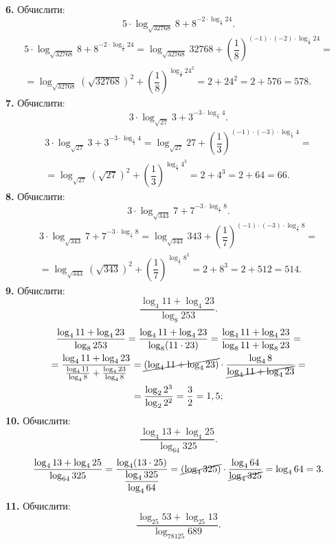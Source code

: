 \textbf{6.} Обчислити:
$$
5\cdot\log_{\sqrt{32768}}8+8^{-2\cdot\log_{\frac{1}{8}}24}.
$$
\begin{multline*}
5\cdot\log_{\sqrt{32768}}8+8^{-2\cdot\log_{\frac{1}{8}}24}=
\log_{\sqrt{32768}}32768+\left(\dfrac{1}{8}\right)^{(-1)\cdot(-2)\cdot\log_{\frac{1}{8}}24}=\\
=\log_{\sqrt{32768}}\left(\sqrt{32768}\right)^2+\left(\dfrac{1}{8}\right)^{\log_{\frac{1}{8}}24^2}=
2+24^2=2+576=578.
\end{multline*}
\textbf{7.} Обчислити:
$$
3\cdot\log_{\sqrt{27}}3+3^{-3\cdot\log_{\frac{1}{3}}4}.
$$
\begin{multline*}
3\cdot\log_{\sqrt{27}}3+3^{-3\cdot\log_{\frac{1}{3}}4}=
\log_{\sqrt{27}}27+\left(\dfrac{1}{3}\right)^{(-1)\cdot(-3)\cdot\log_{\frac{1}{3}}4}=\\
=\log_{\sqrt{27}}\left(\sqrt{27}\right)^2+\left(\dfrac{1}{3}\right)^{\log_{\frac{1}{3}}4^3}=
2+4^3=2+64=66.
\end{multline*}
\textbf{8.} Обчислити:
$$
3\cdot\log_{\sqrt{343}}7+7^{-3\cdot\log_{\frac{1}{7}}8}.
$$
\begin{multline*}
3\cdot\log_{\sqrt{343}}7+7^{-3\cdot\log_{\frac{1}{7}}8}=
\log_{\sqrt{343}}343+\left(\dfrac{1}{7}\right)^{(-1)\cdot(-3)\cdot\log_{\frac{1}{7}}8}=\\
=\log_{\sqrt{343}}\left(\sqrt{343}\right)^2+\left(\dfrac{1}{7}\right)^{\log_{\frac{1}{7}}8^3}=
2+8^3=2+512=514.
\end{multline*}
\textbf{9.} Обчислити:
$$
\frac{\log_4 11 + \log_4 23}{\log_8 253}.
$$
\begin{multline*}
\frac{\log_4 11 + \log_4 23}{\log_8 253} =
\frac{\log_4 11 + \log_4 23}{\log_8 (11 \cdot 23)} =
\frac{\log_4 11 + \log_4 23}{\log_8 11 + \log_8 23} =\\
= \frac{\log_4 11 + \log_4 23}{\frac{\log_4 11}{\log_4 8} + \frac{\log_4 23}{\log_4 8}} =
\cancel{\left(\log_4 11 + \log_4 23\right)} \cdot \frac{\log_4 8}{\cancel{\log_4 11 + \log_4 23}} =\\
= \frac{\log_2 2^3}{\log_2 2^2} = \frac{3}{2} = 1,5;
\end{multline*}
\textbf{10.} Обчислити:
$$
\dfrac{\log_{4}13+\log_{4}25}{\log_{64}325}.
$$
\begin{multline*}
\dfrac{\log_{4}13+\log_{4}25}{\log_{64}325}=
\dfrac{\log_{4}(13\cdot25)}{\dfrac{\log_{4}325}{\log_{4}64}}=
\cancel{\left(\log_{4}325\right)}\cdot\dfrac{\log_{4}64}{\cancel{\log_{4}325}}=
\log_{4}64=3.
\end{multline*}
\textbf{11.} Обчислити:
$$
\dfrac{\log_{25}53+\log_{25}13}{\log_{78125}{689}}.
$$
